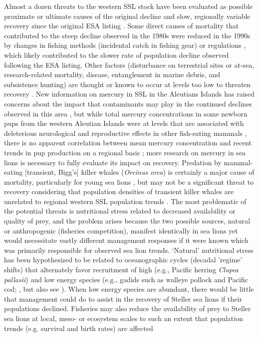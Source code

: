 \documentclass[11pt]{article}
\begin{document}
Almost a dozen threats to the western SSL stock have been evaluated as possible proximate or ultimate causes of the original decline and slow, regionally variable recovery since the original ESA listing \citep{FerreroFritz2002,NMFS2008,AtkinsonEtAl2008}.  Some direct causes of mortality that contributed to the steep decline observed in the 1980s were reduced in the 1990s by changes in fishing methods (incidental catch in fishing gear) or regulations \citep[prohibiting shooting at or near a Steller sea lion and 3 nm no-entry zones around sea lion breeding locations;][]{FritzEtAl1995,FerreroFritz2002,NMFS2008}, which likely contributed to the slower rate of population decline observed following the ESA listing.  Other factors (disturbance on terrestrial sites or at-sea, research-related mortality, disease, entanglement in marine debris, and subsistence hunting) are thought or known to occur at levels too low to threaten recovery \citep{AtkinsonEtAl2008,NMFS2008}.  New information on mercury in SSL in the Aleutians Islands has raised concerns about the impact that contaminants may play in the continued declines observed in this area \citep{CastelliniEtAl2012,ReaEtAl2013}, but while total mercury concentrations in some newborn pups from the western Aleutian Islands were at levels that are associated with deleterious neurological and reproductive effects in other fish-eating mammals \citep{ReaEtAl2013}, there is no apparent correlation between mean mercury concentration and recent trends in pup production on a regional basis \citep{CastelliniEtAl2012}; more research on mercury in sea lions is necessary to fully evaluate its impact on recovery.  Predation by mammal-eating [transient, Bigg's] killer whales ({\it Orcinus orca}) is certainly a major cause of mortality, particularly for young sea lions \citep{HeiseEtAl2003,SpringerEtAl2003,WilliamsEtAl2004,ManiscalcoEtAl2007,HorningMellish2012}, but may not be a significant threat to recovery considering that population densities of transient killer whales are unrelated to regional western SSL population trends \citep{ZerbiniEtAl2007,DurbanEtAl2010,JohnsonFritzInReview}.  The most problematic of the potential threats is nutritional stress related to decreased availability or quality of prey, and the problem arises because the two possible sources, natural or anthropogenic (fisheries competition), manifest identically in sea lions yet would necessitate vastly different management responses if it were known which was primarily responsible for observed sea lion trends.  `Natural' nutritional stress has been hypothesized to be related to oceanographic cycles (decadal 'regime' shifts) that alternately favor recruitment of high (e.g., Pacific herring {\it Clupea pallasii}) and low energy species (e.g., gadids such as walleye pollock and Pacific cod; \citealt{MantuaEtAl1997,HuntStabeno2002,TritesEtAl2007}, but also see \citealt{RudnickDavis2003,FritzHinckley2005}).  When low energy species are abundant, there would be little that management could do to assist in the recovery of Steller sea lions if their populations declined.  Fisheries may also reduce the availability of prey to Steller sea lions at local, meso- or ecosystem scales to such an extent that population trends (e.g. survival and birth rates) are affected 
\end{document}
